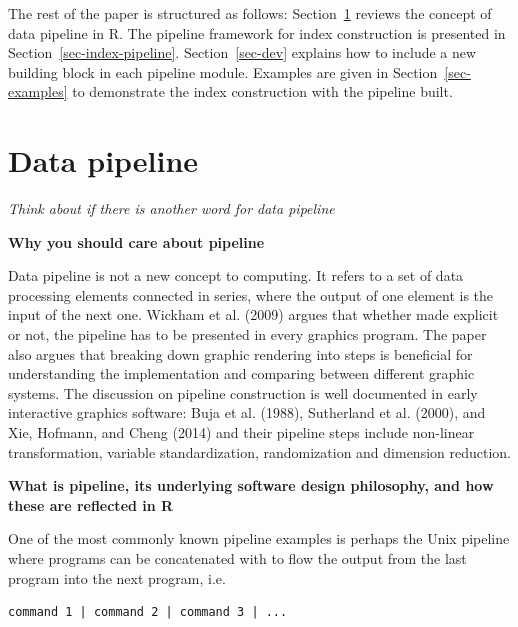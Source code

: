 \documentclass[
]{interact}
\begin{document}
The rest of the paper is structured as follows:
Section~\ref{sec-pipeline} reviews the concept of data pipeline in R.
The pipeline framework for index construction is presented in
Section~\ref{sec-index-pipeline}. Section~\ref{sec-dev} explains how to
include a new building block in each pipeline module. Examples are given
in Section~\ref{sec-examples} to demonstrate the index construction with
the pipeline built.

\hypertarget{sec-pipeline}{%
\section{Data pipeline}\label{sec-pipeline}}

\emph{Think about if there is another word for data pipeline}

\textbf{Why you should care about pipeline}

Data pipeline is not a new concept to computing. It refers to a set of
data processing elements connected in series, where the output of one
element is the input of the next one. Wickham et al. (2009) argues that
whether made explicit or not, the pipeline has to be presented in every
graphics program. The paper also argues that breaking down graphic
rendering into steps is beneficial for understanding the implementation
and comparing between different graphic systems. The discussion on
pipeline construction is well documented in early interactive graphics
software: Buja et al. (1988), Sutherland et al. (2000), and Xie,
Hofmann, and Cheng (2014) and their pipeline steps include non-linear
transformation, variable standardization, randomization and dimension
reduction.

\textbf{What is pipeline, its underlying software design philosophy, and
how these are reflected in R}

One of the most commonly known pipeline examples is perhaps the Unix
pipeline where programs can be concatenated with \texttt{\textbar{}} to
flow the output from the last program into the next program, i.e.~

\begin{verbatim}
command 1 | command 2 | command 3 | ...
\end{verbatim}
\end{document}
